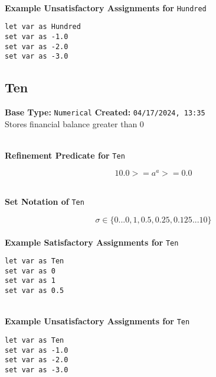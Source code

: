 \documentclass{article}
\begin{document}
\textbf{\\ Example Unsatisfactory Assignments for } \texttt{Hundred}
\begin{verbatim}
let var as Hundred
set var as -1.0
set var as -2.0
set var as -3.0
\end{verbatim}


\clearpage

\subsection{Ten}
\textbf{Base Type:} \verb|Numerical| \hfill \textbf{Created:} \verb|04/17/2024, 13:35| \\
Stores financial balance greater than 0

\textbf{\\ Refinement Predicate for } \texttt{Ten}

$$ 10.0 >= a ^ a >= 0.0 $$

\textbf{\\ Set Notation of } \texttt{Ten}

$$\sigma \in \{ 0 ... 0, 1, 0.5, 0.25, 0.125 ... 10 \}$$ \ \
\textbf{\\ Example Satisfactory Assignments for } \texttt{Ten}
\begin{verbatim}
let var as Ten
set var as 0
set var as 1
set var as 0.5
\end{verbatim}


\textbf{\\ Example Unsatisfactory Assignments for } \texttt{Ten}
\begin{verbatim}
let var as Ten
set var as -1.0
set var as -2.0
set var as -3.0
\end{verbatim}


\clearpage
\end{document}
